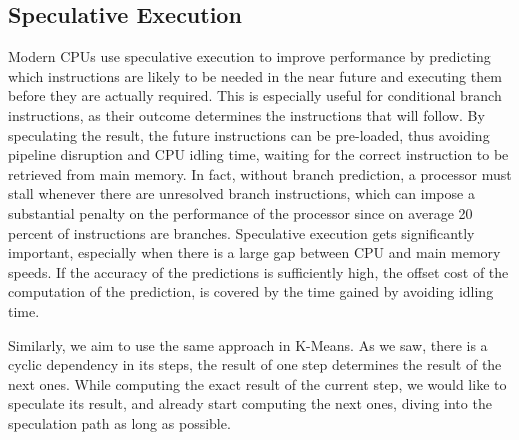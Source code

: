 \subsection{Speculative Execution}
Modern CPUs use speculative execution to improve performance by predicting which instructions are likely to be needed in the near future and executing them before they are actually required. This is especially useful for conditional branch instructions, as their outcome determines the instructions that will follow. By speculating the result, the future instructions can be pre-loaded, thus avoiding pipeline disruption and CPU idling time, waiting for the correct instruction to be retrieved from main memory. In fact, without branch prediction, a processor must stall whenever there are unresolved branch instructions, which can impose a substantial penalty on the performance of the processor since on average 20 percent of instructions are branches. Speculative execution gets significantly important, especially when there is a large gap between CPU and main memory speeds. If the accuracy of the predictions is sufficiently high, the offset cost of the computation of the prediction, is covered by the time gained by avoiding idling time.

Similarly, we aim to use the same approach in K-Means. As we saw, there is a cyclic dependency in its steps, the result of one step determines the result of the next ones. While computing the exact result of the current step, we would like to speculate its result, and already start computing the next ones, diving into the speculation path as long as possible.
